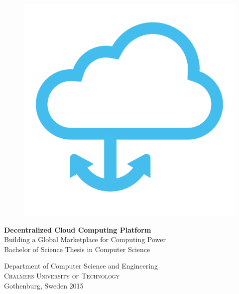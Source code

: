 
\begin{titlepage}
			
\addtolength{\voffset}{2cm}

\begin{figure}[h!]
\centering
\vspace{2cm}	%
\includegraphics[width=0.6\linewidth]{figure/logo}
\end{figure}

\mbox{}
\vfill
\renewcommand{\familydefault}{\sfdefault} \normalfont %
\noindent \textbf{\Huge Decentralized Cloud Computing Platform}\\[0.2cm]
{\Large Building a Global Marketplace for Computing Power}\\[0.5cm]
Bachelor of Science Thesis in Computer Science \\[0.5cm]


\noindent Department of Computer Science and Engineering \\
\textsc{Chalmers University of Technology} \\
Gothenburg, Sweden 2015

\renewcommand{\familydefault}{\rmdefault} \normalfont %
\end{titlepage}



